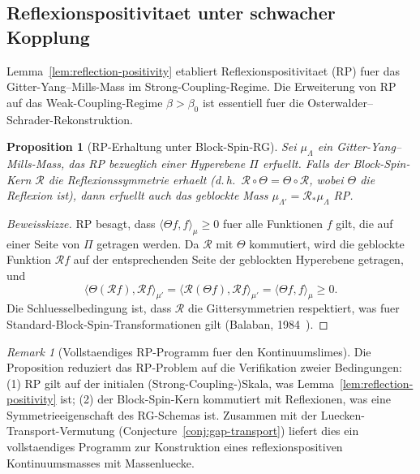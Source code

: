 \documentclass[12pt,a4paper]{article}
\theoremstyle{definition}
\theoremstyle{plain}
\newtheorem{proposition}[definition]{Proposition}
\theoremstyle{remark}
\newtheorem{remark}[definition]{Remark}
\begin{document}
\subsection{Reflexionspositivitaet unter schwacher Kopplung}
\label{sec:rp-weak}

Lemma~\ref{lem:reflection-positivity} etabliert Reflexionspositivitaet (RP) fuer das Gitter-Yang--Mills-Mass im Strong-Coupling-Regime. Die Erweiterung von RP auf das Weak-Coupling-Regime $\beta > \beta_0$ ist essentiell fuer die Osterwalder--Schrader-Rekonstruktion.

\begin{proposition}[RP-Erhaltung unter Block-Spin-RG]
\label{prop:rp-preservation}
Sei $\mu_\Lambda$ ein Gitter-Yang--Mills-Mass, das RP bezueglich einer Hyperebene $\Pi$ erfuellt. Falls der Block-Spin-Kern $\mathcal{R}$ die Reflexionssymmetrie erhaelt (d.\,h.\ $\mathcal{R} \circ \Theta = \Theta \circ \mathcal{R}$, wobei $\Theta$ die Reflexion ist), dann erfuellt auch das geblockte Mass $\mu_{\Lambda'} = \mathcal{R}_* \mu_\Lambda$ RP.
\end{proposition}

\begin{proof}[Beweisskizze]
RP besagt, dass $\langle \Theta f, f \rangle_{\mu} \geq 0$ fuer alle Funktionen $f$ gilt, die auf einer Seite von $\Pi$ getragen werden. Da $\mathcal{R}$ mit $\Theta$ kommutiert, wird die geblockte Funktion $\mathcal{R} f$ auf der entsprechenden Seite der geblockten Hyperebene getragen, und
\[
\langle \Theta(\mathcal{R} f), \mathcal{R} f \rangle_{\mu'} = \langle \mathcal{R}(\Theta f), \mathcal{R} f \rangle_{\mu'} = \langle \Theta f, f \rangle_\mu \geq 0.
\]
Die Schluesselbedingung ist, dass $\mathcal{R}$ die Gittersymmetrien respektiert, was fuer Standard-Block-Spin-Transformationen gilt (Balaban, 1984~\cite{Balaban1985b}).
\end{proof}

\begin{remark}[Vollstaendiges RP-Programm fuer den Kontinuumslimes]
Die Proposition reduziert das RP-Problem auf die Verifikation zweier Bedingungen: (1) RP gilt auf der initialen (Strong-Coupling-)Skala, was Lemma~\ref{lem:reflection-positivity} ist; (2) der Block-Spin-Kern kommutiert mit Reflexionen, was eine Symmetrieeigenschaft des RG-Schemas ist. Zusammen mit der Luecken-Transport-Vermutung (Conjecture~\ref{conj:gap-transport}) liefert dies ein vollstaendiges Programm zur Konstruktion eines reflexionspositiven Kontinuumsmasses mit Massenluecke.
\end{remark}
\end{document}
